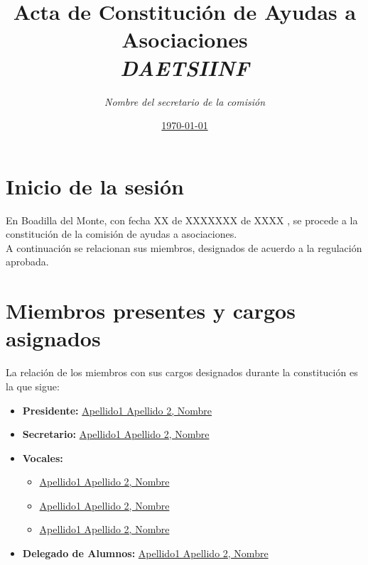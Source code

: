 \documentclass[12pt, a4paper, spanish]{article}
\title{\textbf{Acta de Constitución de Ayudas a Asociaciones} \\[2ex]
	\emph{DAETSIINF}}
\author{\emph{Nombre del secretario de la comisión}}
\date{\underline{\today}}
\begin{document}
	\maketitle
    \thispagestyle{empty}
	\renewcommand*\contentsname{Índice de contenidos}
	\tableofcontents
    \pagebreak
	
    
    
    \section{Inicio de la sesión}
    En Boadilla del Monte, con fecha XX de XXXXXXX de XXXX , se procede a la constitución de la comisión de ayudas a asociaciones.\\
    A continuación se relacionan sus miembros, designados de acuerdo a la regulación aprobada.

    \section{Miembros presentes y cargos asignados}
    La relación de los miembros con sus cargos designados durante la constitución es la que sigue:

    \begin{itemize}
        \item \textbf{Presidente:} \underline{Apellido1 Apellido 2, Nombre}
        \item \textbf{Secretario:} \underline{Apellido1 Apellido 2, Nombre}
        \item \textbf{Vocales:} 
        \begin{itemize}
            \item \underline{Apellido1 Apellido 2, Nombre}
            \item \underline{Apellido1 Apellido 2, Nombre}
            \item \underline{Apellido1 Apellido 2, Nombre}
        \end{itemize}
        \item \textbf{Delegado de Alumnos:} \underline{Apellido1 Apellido 2, Nombre}
    \end{itemize}

    \quad

    \quad

    \quad 

    \quad

    \quad
    
    \quad
    
\end{document}
